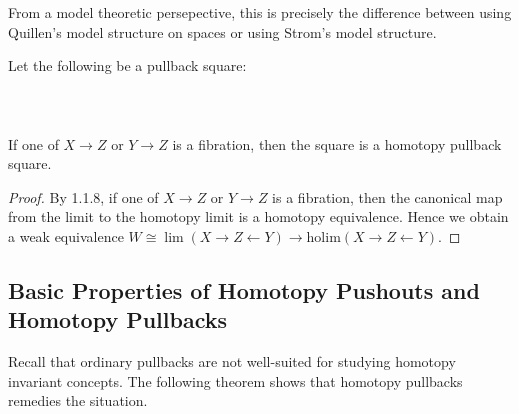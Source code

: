 \documentclass[a4paper]{article}
\begin{document}
From a model theoretic persepective, this is precisely the difference between using Quillen's model structure on spaces or using Strom's model structure. 

\begin{prp}{}{} Let the following be a pullback square: \\~\\
\\~\\
If one of $X\to Z$ or $Y\to Z$ is a fibration, then the square is a homotopy pullback square. \tcbline
\begin{proof}
By 1.1.8, if one of $X\to Z$ or $Y\to Z$ is a fibration, then the canonical map from the limit to the homotopy limit is a homotopy equivalence. Hence we obtain a weak equivalence $W\cong\lim(X\rightarrow Z\leftarrow Y)\to\text{holim}(X\rightarrow Z\leftarrow Y)$. 
\end{proof}
\end{prp}

\subsection{Basic Properties of Homotopy Pushouts and Homotopy Pullbacks}
Recall that ordinary pullbacks are not well-suited for studying homotopy invariant concepts. The following theorem shows that homotopy pullbacks remedies the situation. 
\end{document}
